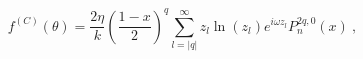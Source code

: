 \begin{equation}
f^{(C)}(\theta)=\frac{2\eta}k\left(\frac{1-x}2\right)^q\sum_{l=|q|}^\infty
z_l\ln(z_l)e^{i\omega z_l}P_n^{2q,0}(x) \ ,
\end{equation}

